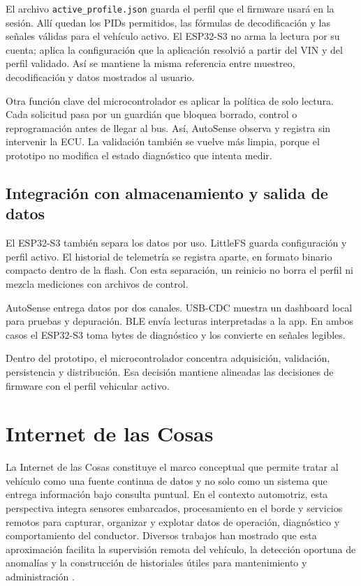 \documentclass[12pt,letterpaper]{report}
\begin{document}
El archivo \texttt{active\_profile.json} guarda el perfil que el firmware usará en la sesión. Allí quedan los PIDs permitidos, las fórmulas de decodificación y las señales válidas para el vehículo activo. El ESP32-S3 no arma la lectura por su cuenta; aplica la configuración que la aplicación resolvió a partir del VIN y del perfil validado. Así se mantiene la misma referencia entre muestreo, decodificación y datos mostrados al usuario.

Otra función clave del microcontrolador es aplicar la política de solo lectura. Cada solicitud pasa por un guardián que bloquea borrado, control o reprogramación antes de llegar al bus. Así, AutoSense observa y registra sin intervenir la ECU. La validación también se vuelve más limpia, porque el prototipo no modifica el estado diagnóstico que intenta medir.

\subsection{Integración con almacenamiento y salida de datos}

El ESP32-S3 también separa los datos por uso. LittleFS guarda configuración y perfil activo. El historial de telemetría se registra aparte, en formato binario compacto dentro de la flash. Con esta separación, un reinicio no borra el perfil ni mezcla mediciones con archivos de control.

AutoSense entrega datos por dos canales. USB-CDC muestra un dashboard local para pruebas y depuración. BLE envía lecturas interpretadas a la app. En ambos casos el ESP32-S3 toma bytes de diagnóstico y los convierte en señales legibles.

Dentro del prototipo, el microcontrolador concentra adquisición, validación, persistencia y distribución. Esa decisión mantiene alineadas las decisiones de firmware con el perfil vehicular activo.

\section{Internet de las Cosas}
\label{sec:iot}

La Internet de las Cosas constituye el marco conceptual que permite tratar al vehículo como una fuente continua de datos y no solo como un sistema que entrega información bajo consulta puntual. En el contexto automotriz, esta perspectiva integra sensores embarcados, procesamiento en el borde y servicios remotos para capturar, organizar y explotar datos de operación, diagnóstico y comportamiento del conductor. Diversos trabajos han mostrado que esta aproximación facilita la supervisión remota del vehículo, la detección oportuna de anomalías y la construcción de historiales útiles para mantenimiento y administración \cite{shafi2018_vehicle_remote_health,camposferreira2023_vehicle_driver_monitoring,singh2021_obdii_iot,dabarera2022_iot_vehicle_management,zhang2020_iov_edge}.
\end{document}
